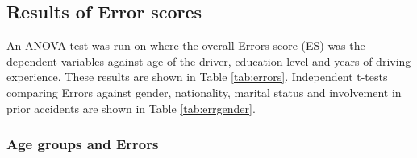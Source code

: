 \documentclass[preprint,12pt,a4paper,authoryear]{elsarticle}
\begin{document}
\begin{table}[H]
\centering
\caption{Results of t-tests for ARS.}
\label{tab:married}
\end{table}

\subsection{Results of Error scores}

An ANOVA test was run on where the overall Errors score (ES) was the dependent variables against age of the driver, education level and years of driving experience. These results are shown in Table \ref{tab:errors}. Independent t-tests comparing Errors against gender, nationality, marital status and involvement in prior accidents are shown in Table \ref{tab:errgender}. 

\subsubsection{Age groups and Errors}
\end{document}
